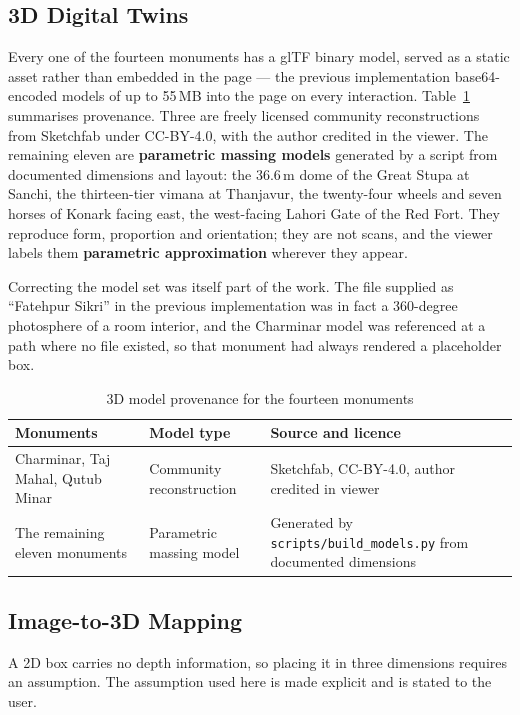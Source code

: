 \documentclass[a4paper,12pt,oneside]{book}
\begin{document}
\subsection{3D Digital Twins}
Every one of the fourteen monuments has a glTF binary model, served as a static asset rather than embedded in the page --- the previous implementation base64-encoded models of up to 55\,MB into the page on every interaction. Table~\ref{tab:models} summarises provenance. Three are freely licensed community reconstructions from Sketchfab under CC-BY-4.0, with the author credited in the viewer. The remaining eleven are \textbf{parametric massing models} generated by a script from documented dimensions and layout: the 36.6\,m dome of the Great Stupa at Sanchi, the thirteen-tier vimana at Thanjavur, the twenty-four wheels and seven horses of Konark facing east, the west-facing Lahori Gate of the Red Fort. They reproduce form, proportion and orientation; they are not scans, and the viewer labels them \textbf{parametric approximation} wherever they appear.

Correcting the model set was itself part of the work. The file supplied as ``Fatehpur Sikri'' in the previous implementation was in fact a 360-degree photosphere of a room interior, and the Charminar model was referenced at a path where no file existed, so that monument had always rendered a placeholder box.

\begin{table}[H]
\centering
\caption{3D model provenance for the fourteen monuments}
\label{tab:models}
\renewcommand{\arraystretch}{1.2}
{\footnotesize
\begin{tabular}{|l|l|l|}
\hline
\textbf{Monuments} & \textbf{Model type} & \textbf{Source and licence} \\ \hline
Charminar, Taj Mahal, Qutub Minar & Community reconstruction & Sketchfab, CC-BY-4.0, author credited in viewer \\ \hline
The remaining eleven monuments & Parametric massing model & Generated by \texttt{scripts/build\_models.py} from documented dimensions \\ \hline
\end{tabular}}
\end{table}

\subsection{Image-to-3D Mapping}
A 2D box carries no depth information, so placing it in three dimensions requires an assumption. The assumption used here is made explicit and is stated to the user.
\end{document}

